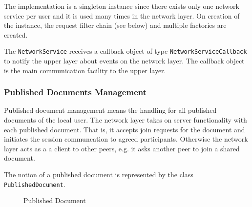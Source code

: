 The implementation is a singleton instance since there exists only one network service per user and it is used many times in the network layer. On creation of the instance, the request filter chain (see below) and multiple factories are created.

The \texttt{NetworkService} receives a callback object of type \texttt{NetworkServiceCallback} to notify the upper layer about events on the network layer. The callback object is the main communication facility to the upper layer.


\subsubsection{Published Documents Management}
Published document management means the handling for all published documents of the local user. The network layer takes on server functionality with each published document. That is, it accepts join requests for the document and initiates the session communcation to agreed participants. Otherwise the network layer acts as a a client to other peers, e.g. it asks another peer to join a shared document. 

The notion of a published document is represented by the class \texttt{PublishedDocument}.

\begin{figure}[H]
 \centering
 \caption{Published Document}
 \label{fig:network.discovery.publisheddocument.uml}
\end{figure}

